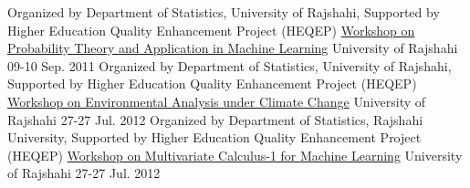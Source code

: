 \begin{cventries}

  \cventry
    {Organized by Department of Statistics, University of Rajshahi, Supported by Higher Education Quality Enhancement Project (HEQEP)} %
     {\href{https://www.dropbox.com/sh/jidy98v25ysinpy/AACromMNsOPSoxjBDGXfFEBUa?dl=0}{Workshop on Probability Theory and Application in Machine Learning}} %
    {University of Rajshahi} %
    {09-10 Sep. 2011} %
{}
\vspace{-.5\baselineskip}
  \cventry
    { Organized by Department of Statistics, University of Rajshahi, Supported by Higher Education Quality Enhancement Project (HEQEP)} %
    {\href{https://www.dropbox.com/sh/hsxtwcne7rffh6p/AACM1neE7yTSG0ZSULl2-s-Ma?dl=0}{Workshop on Environmental Analysis under Climate Change}} %
    {University of Rajshahi} %
    {27-27 Jul. 2012} %
  {}
\vspace{-.5\baselineskip}
  \cventry
    {Organized by Department of Statistics, Rajshahi University, Supported by Higher Education Quality Enhancement Project (HEQEP)} %
    {\href{https://www.dropbox.com/sh/lhebu591ov72i1g/AABRdeeaZJLzi7R2TDXRVFkxa?dl=0}{Workshop on Multivariate Calculus-1 for Machine Learning}} %
    {University of Rajshahi} %
    {27-27 Jul. 2012} %
  {}
\vspace{-.5\baselineskip}
\end{cventries}
